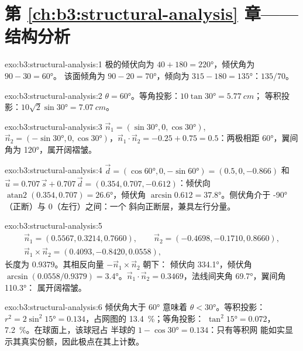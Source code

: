 \section*{第 \ref{ch:b3:structural-analysis} 章——结构分析}

\begin{solution}{exo:b3:structural-analysis:1}
极的倾伏向为 $40 + 180 = \ang{220}$，倾伏角为 $90 - 30 = \ang{60}$。
该面倾角为 $90 - 20 = \ang{70}$，倾向为 $315 - 180 = \ang{135}$：$135/70$。
\end{solution}

\begin{solution}{exo:b3:structural-analysis:2}
$\theta = \ang{60}$。等角投影：$10\tan\ang{30} = \qty{5.77}{cm}$；
等积投影：$10\sqrt2\sin\ang{30} = \qty{7.07}{cm}$。
\end{solution}

\begin{solution}{exo:b3:structural-analysis:3}
$\vec n_1 = (\sin\ang{30}, 0, \cos\ang{30})$, $\vec n_2 = (-\sin\ang{30}, 0,
\cos\ang{30})$，$\vec n_1\cdot\vec n_2 = -0.25 + 0.75 = 0.5$：两极相距 
\ang{60}，翼间角为 \ang{120}，属开阔褶皱。
\end{solution}

\begin{solution}{exo:b3:structural-analysis:4}
$\vec d = (\cos\ang{60}, 0, -\sin\ang{60}) = (0.5, 0, -0.866)$ 和 $\vec u =
0.707\,\vec s + 0.707\,\vec d = (0.354, 0.707, -0.612)$：倾伏向
$\operatorname{atan2}(0.354, 0.707) = \ang{26.6}$，倾伏角 $\arcsin0.612 =
\ang{37.8}$。侧伏角介于 \ang{-90}（正断）与 0（左行）之间：一个
斜向正断层，兼具左行分量。
\end{solution}

\begin{solution}{exo:b3:structural-analysis:5}
\begin{gather*}
  \vec n_1 = (0.5567, 0.3214, 0.7660),\qquad \vec n_2 = (-0.4698, -0.1710, 0.8660),\\
  \vec n_1\times\vec n_2 = (0.4093, -0.8420, 0.0558),
\end{gather*}
长度为 $0.9379$。其相反向量 $-\vec n_1\times\vec n_2$ 朝下：
倾伏向 \ang{334.1}，倾伏角 $\arcsin(0.0558/0.9379) = \ang{3.4}$。$\vec n_1\cdot\vec
n_2 = 0.3469$，法线间夹角 \ang{69.7}，翼间角 \ang{110.3}：
属开阔褶皱。
\end{solution}

\begin{solution}{exo:b3:structural-analysis:6}
倾伏角大于 \ang{60} 意味着 $\theta < \ang{30}$。等积投影：$r^2 =
2\sin^2\ang{15} = 0.134$，占网图的 \qty{13.4}{\percent}；等角投影：
$\tan^2\ang{15} = 0.072$，\qty{7.2}{\percent}。在球面上，该球冠占
半球的 $1 - \cos\ang{30} = 0.134$：只有等积网
能如实显示其真实份额，因此极点在其上计数。
\end{solution}

